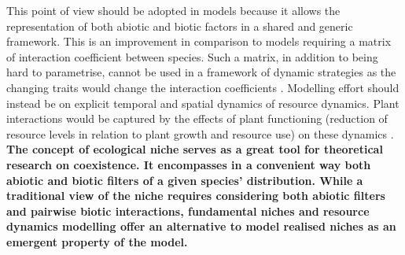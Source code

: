 This point of view should be adopted in models \parencite{berger_competition_2008} because it allows the representation of both abiotic and biotic factors in a shared and generic framework. This is an improvement in comparison to models requiring a matrix of interaction coefficient between species. Such a matrix, in addition to being hard to parametrise, cannot be used in a framework of dynamic strategies as the changing traits would change the interaction coefficients . Modelling effort should instead be on explicit temporal and spatial dynamics of resource dynamics. Plant interactions would be captured by the effects of plant functioning (reduction of resource levels in relation to plant growth and resource use) on these dynamics \parencite{berger_competition_2008, morin_comparing_2009}.\\


\textbf{The concept of ecological niche serves as a great tool for theoretical research on coexistence. It encompasses in a convenient way both abiotic and biotic filters of a given species' distribution. While a traditional view of the niche requires considering both abiotic filters and pairwise biotic interactions, fundamental niches and resource dynamics modelling offer an alternative to model realised niches as an emergent property of the model.}



